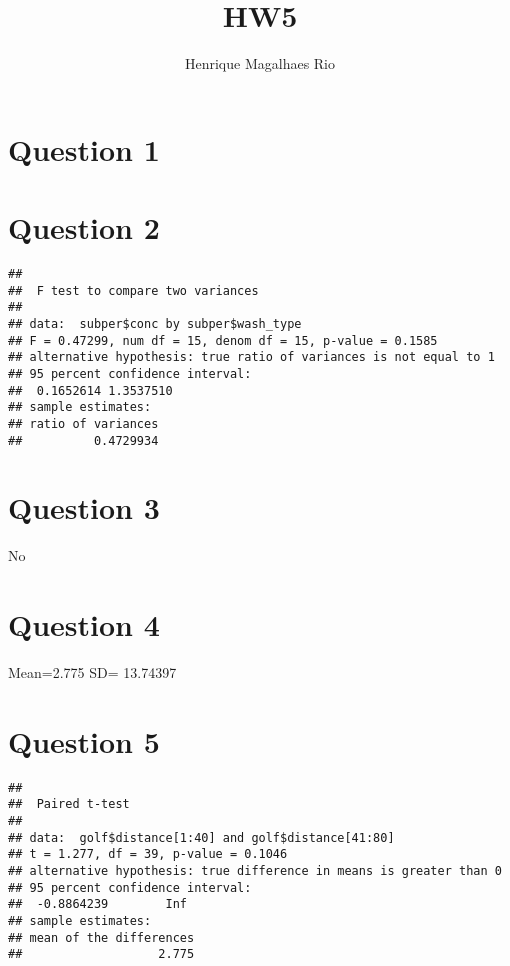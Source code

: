 \documentclass[]{article}
\title{HW5}
\author{Henrique Magalhaes Rio}
\date{}
\begin{document}
\maketitle


\newcommand{\answerstart}{ \colorlet{shadecolor}{orange!20}
\begin{shaded} }
\newcommand{\answerend}{  \end{shaded} \colorlet{shadecolor}{gray!10}}

\hypertarget{question-1}{%
\section{Question 1}\label{question-1}}

\hypertarget{question-2}{%
\section{Question 2}\label{question-2}}

\begin{verbatim}
## 
##  F test to compare two variances
## 
## data:  subper$conc by subper$wash_type
## F = 0.47299, num df = 15, denom df = 15, p-value = 0.1585
## alternative hypothesis: true ratio of variances is not equal to 1
## 95 percent confidence interval:
##  0.1652614 1.3537510
## sample estimates:
## ratio of variances 
##          0.4729934
\end{verbatim}

\hypertarget{question-3}{%
\section{Question 3}\label{question-3}}

No

\hypertarget{question-4}{%
\section{Question 4}\label{question-4}}

Mean=2.775 SD= 13.74397

\hypertarget{question-5}{%
\section{Question 5}\label{question-5}}

\begin{verbatim}
## 
##  Paired t-test
## 
## data:  golf$distance[1:40] and golf$distance[41:80]
## t = 1.277, df = 39, p-value = 0.1046
## alternative hypothesis: true difference in means is greater than 0
## 95 percent confidence interval:
##  -0.8864239        Inf
## sample estimates:
## mean of the differences 
##                   2.775
\end{verbatim}
\end{document}

